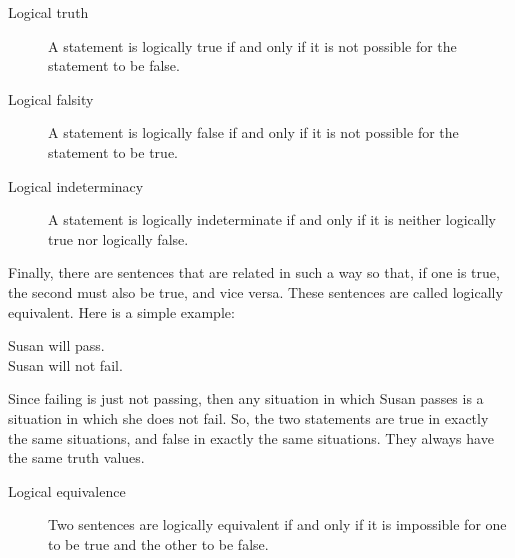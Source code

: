 \documentclass[../logic-text.tex]{subfiles}
\begin{document}
\begin{description}
  \item[Logical truth] A statement is logically true if and only if it is not possible for the statement to be false.
  \item[Logical falsity] A statement is logically false if and only if it is not possible for the statement to be true.
  \item[Logical indeterminacy] A statement is logically indeterminate if and only if it is neither logically true nor logically false.
\end{description}

Finally, there are sentences that are related in such a way so that, if one is true, the second must also be true, and vice versa. These sentences are called logically equivalent. Here is a simple example:

\medskip

Susan will pass.\\

Susan will not fail.

\medskip

Since failing is just not passing, then any situation in which Susan passes is a situation in which she does not fail. So, the two statements are true in exactly the same situations, and false in exactly the same situations. They always have the same truth values.

\begin{description}
  \item[Logical equivalence]  Two sentences are logically equivalent if and only if it is impossible for one to be true and the other to be false.
\end{description}
\end{document}
